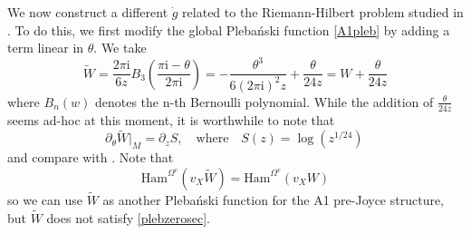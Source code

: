 \documentclass{article}
\theoremstyle{definition}
\numberwithin{equation}{section}
\begin{document}
We now construct a different $\dot{g}$ related to the Riemann-Hilbert problem studied in \cite{varBPS}. To do this, we first modify the global Pleba\'nski function  \eqref{A1pleb} by adding a term linear in $\theta$. We take
\begin{equation}
    \widetilde{W}=\frac{2\pi \mathrm{i}}{6z}B_3\left(\frac{\pi \mathrm{i}-\theta}{2\pi \mathrm{i}}\right)=-\frac{\theta^3}{6(2\pi \mathrm{i})^2z}+\frac{\theta}{24z}= W+\frac{\theta}{24z}
\end{equation}
where $B_n(w)$ denotes the n-th Bernoulli polynomial. While the addition of $\frac{\theta}{24z}$ seems ad-hoc at this moment, it is worthwhile to note that
\begin{equation*}
    \partial_{\theta}\widetilde{W}|_{M}=\partial_zS,\quad \text{where}\quad S(z)=\log(z^{1/24})\,
\end{equation*}
and compare with \cite[Equations (21) and (22)]{BridgeFab}. Note that 
\begin{equation*}
    \text{Ham}^{\Omega^{v}}(v_X\widetilde{W})=\text{Ham}^{\Omega^{v}}(v_XW)
\end{equation*}
so we can use $\widetilde{W}$ as another Pleba\'nski function for the A1 pre-Joyce structure, but $\widetilde{W}$ does not satisfy \eqref{plebzerosec}. \\
\end{document}
